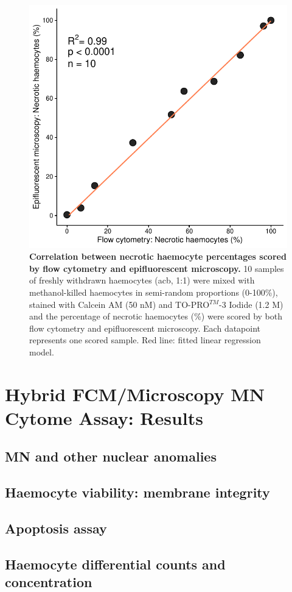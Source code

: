 \begin{figure}[h]
    \centering
    \includegraphics[width=.5\textwidth]{figures/Method development/FCM FM lin reg.pdf}
    \caption{\textbf{Correlation between necrotic haemocyte percentages scored by flow cytometry and epifluorescent microscopy.} 10 samples of freshly withdrawn haemocytes (\acrshort{acb}, 1:1) were mixed with methanol-killed haemocytes in semi-random proportions (0-100\%), stained with Calcein AM (50 nM) and TO-PRO$^{TM}$-3 Iodide (1.2 \micro M) and the percentage of necrotic haemocytes (\%) were scored by both flow cytometry and epifluorescent microscopy. Each datapoint represents one scored sample. Red line: fitted linear regression model.}
    \label{fig:method_val_1}
\end{figure}



\newpage
\section{Hybrid FCM/Microscopy MN Cytome Assay: Results}
\subsection{MN and other nuclear anomalies}
\subsection{Haemocyte viability: membrane integrity}
\subsection{Apoptosis assay}
\subsection{Haemocyte differential counts and concentration}

